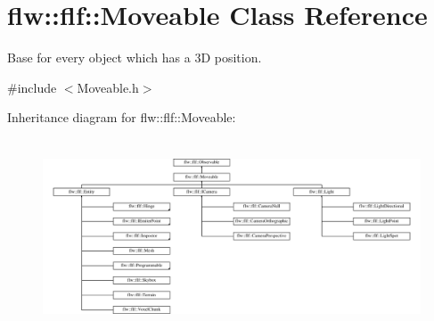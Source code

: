 \hypertarget{classflw_1_1flf_1_1Moveable}{}\section{flw\+:\+:flf\+:\+:Moveable Class Reference}
\label{classflw_1_1flf_1_1Moveable}


Base for every object which has a 3D position.  




{\ttfamily \#include $<$Moveable.\+h$>$}

Inheritance diagram for flw\+:\+:flf\+:\+:Moveable\+:\begin{figure}[H]
\begin{center}
\leavevmode
\includegraphics[height=5.767790cm]{classflw_1_1flf_1_1Moveable}
\end{center}
\end{figure}
